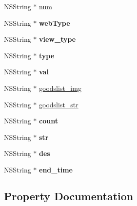 \begin{DoxyCompactItemize}
N\+S\+String $\ast$ \mbox{\hyperlink{interface_f_n_tab_model_a59e28962cc504a464a8b05342cd1277f}{num}}
\item 
\mbox{\label{interface_f_n_tab_model_a77c7bc2063d603b1b7b833838bb9d6c4}} 
N\+S\+String $\ast$ {\bfseries web\+Type}
\item 
\mbox{\label{interface_f_n_tab_model_a8155e17a26376d5c84e33db656d00a6e}} 
N\+S\+String $\ast$ {\bfseries view\+\_\+type}
\item 
\mbox{\label{interface_f_n_tab_model_a54583b95026f8f1059661eff26b08e17}} 
N\+S\+String $\ast$ {\bfseries type}
\item 
\mbox{\label{interface_f_n_tab_model_a054dd103035d3e50a73aeab95fc6372e}} 
N\+S\+String $\ast$ {\bfseries val}
\item 
N\+S\+String $\ast$ \mbox{\hyperlink{interface_f_n_tab_model_a343b027a8746a50b958f95d9cc5aa104}{goodslist\+\_\+img}}
\item 
N\+S\+String $\ast$ \mbox{\hyperlink{interface_f_n_tab_model_a528cb369fb201b53e008ba5f27fa3f2c}{goodslist\+\_\+str}}
\item 
\mbox{\label{interface_f_n_tab_model_a42d2a4968209bda2c31289c5ee75e511}} 
N\+S\+String $\ast$ {\bfseries count}
\item 
\mbox{\label{interface_f_n_tab_model_a924dad0c02fabda381a4f437c69ddf56}} 
N\+S\+String $\ast$ {\bfseries str}
\item 
\mbox{\label{interface_f_n_tab_model_a009b6ce4d1254c2c700b34a1a7592416}} 
N\+S\+String $\ast$ {\bfseries des}
\item 
\mbox{\label{interface_f_n_tab_model_a06d4ac3f7a0f9ef587e8891ef59a5739}} 
N\+S\+String $\ast$ {\bfseries end\+\_\+time}
\end{DoxyCompactItemize}


\subsection{Property Documentation}
\mbox{\label{interface_f_n_tab_model_abed859dc5eae88634b910fb1aac8368d}} 
